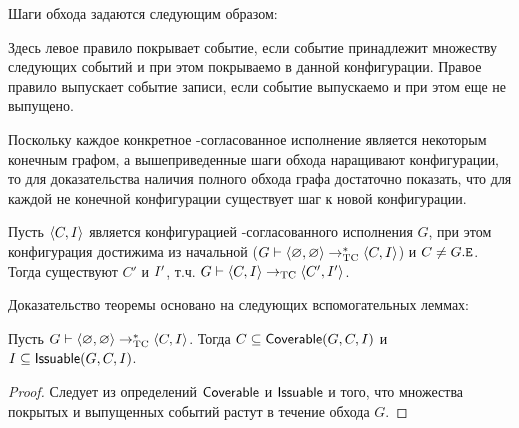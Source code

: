 Шаги обхода задаются следующим образом:
Здесь левое правило покрывает событие, если событие принадлежит множеству
следующих событий и при этом покрываемо в данной конфигурации.
Правое правило выпускает событие записи, если событие выпускаемо и при этом еще не выпущено.

Поскольку каждое конкретное \ARM-согласованное исполнение является некоторым конечным графом,
а вышеприведенные шаги обхода наращивают конфигурации, то для доказательства наличия полного
обхода графа достаточно показать, что для каждой не конечной конфигурации существует шаг к новой конфигурации.
\begin{theorem}
  \label{prop:trav-step}
  Пусть ${\langle{C, I}\rangle}$ является конфигурацией \ARM-согласованного исполнения $G$,
  при этом конфигурация достижима из начальной
  ($G \vdash {\langle{\varnothing, \varnothing}\rangle} \rightarrow_{\rm TC}^{*} {\langle{C, I}\rangle}$) и $C \neq G.{\mathtt{E}}$.
  Тогда существуют $C'$ и $I'$, т.ч. 
  $G \vdash {\langle{C, I}\rangle} \rightarrow_{\rm TC} {\langle{C', I'}\rangle}$.
\end{theorem}
Доказательство теоремы основано на следующих вспомогательных леммах:
\begin{lemma}
  \label{prop:trav-prop-preserve}
  Пусть $G \vdash {\langle{\varnothing, \varnothing}\rangle} \rightarrow_{\rm TC}^{*} {\langle{C, I}\rangle}$.
  Тогда $C \subseteq {\sf Coverable}(G,C,I)$ и $I \subseteq {\sf Issuable}(G,C,I)$.
\end{lemma}
\begin{proof}
  Следует из определений ${\sf Coverable}$ и ${\sf Issuable}$ и того, что множества покрытых и выпущенных событий растут в течение обхода $G$.
\end{proof}

